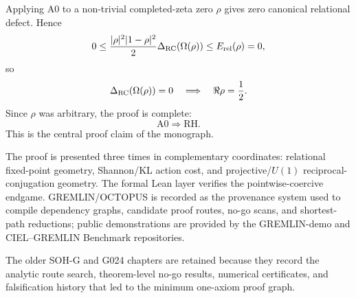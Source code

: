 Applying A0 to a non-trivial completed-zeta zero \(\rho\) gives zero canonical
relational defect.  Hence
\[
0
\le
\frac{|\rho|^2|1-\rho|^2}{2}
\Delta_{\rm RC}(\Omega(\rho))
\le
E_{\rm rel}(\rho)
=
0,
\]
so
\[
\Delta_{\rm RC}(\Omega(\rho))=0
\quad\Longrightarrow\quad
\Re\rho=\frac12.
\]
Since \(\rho\) was arbitrary, the proof is complete:
\[
\boxed{\mathrm{A0}\Longrightarrow\mathrm{RH}.}
\]
This is the central proof claim of the monograph.

The proof is presented three times in complementary coordinates: relational
fixed-point geometry, Shannon/KL action cost, and projective/\(U(1)\)
reciprocal-conjugation geometry.  The formal Lean layer verifies the
pointwise-coercive endgame.  GREMLIN/OCTOPUS is recorded as the provenance
system used to compile dependency graphs, candidate proof routes, no-go scans,
and shortest-path reductions; public demonstrations are provided by the
GREMLIN-demo and CIEL--GREMLIN Benchmark repositories.

The older SOH-G and G024 chapters are retained because they record the
analytic route search, theorem-level no-go results, numerical certificates,
and falsification history that led to the minimum one-axiom proof graph.

